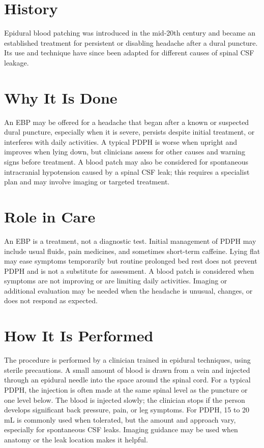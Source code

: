 \section*{History}
Epidural blood patching was introduced in the mid-20th century and became an established treatment for persistent or disabling headache after a dural puncture. Its use and technique have since been adapted for different causes of spinal CSF leakage.

\section*{Why It Is Done}
An EBP may be offered for a headache that began after a known or suspected dural puncture, especially when it is severe, persists despite initial treatment, or interferes with daily activities. A typical PDPH is worse when upright and improves when lying down, but clinicians assess for other causes and warning signs before treatment. A blood patch may also be considered for spontaneous intracranial hypotension caused by a spinal CSF leak; this requires a specialist plan and may involve imaging or targeted treatment.

\section*{Role in Care}
An EBP is a treatment, not a diagnostic test. Initial management of PDPH may include usual fluids, pain medicines, and sometimes short-term caffeine. Lying flat may ease symptoms temporarily but routine prolonged bed rest does not prevent PDPH and is not a substitute for assessment. A blood patch is considered when symptoms are not improving or are limiting daily activities. Imaging or additional evaluation may be needed when the headache is unusual, changes, or does not respond as expected.

\section*{How It Is Performed}
The procedure is performed by a clinician trained in epidural techniques, using sterile precautions. A small amount of blood is drawn from a vein and injected through an epidural needle into the space around the spinal cord. For a typical PDPH, the injection is often made at the same spinal level as the puncture or one level below. The blood is injected slowly; the clinician stops if the person develops significant back pressure, pain, or leg symptoms. For PDPH, 15 to 20 mL is commonly used when tolerated, but the amount and approach vary, especially for spontaneous CSF leaks. Imaging guidance may be used when anatomy or the leak location makes it helpful.


